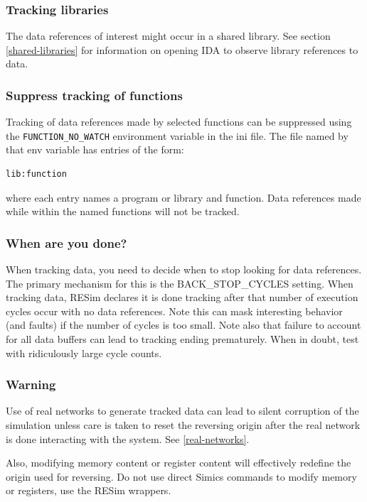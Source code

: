 \documentclass[titlepage]{article}
\begin{document}
\subsubsection{Tracking libraries}
The data references of interest might occur in a shared library.  See section \ref{shared-libraries} for information on opening IDA to 
observe library references to data.

\subsubsection{Suppress tracking of functions}
\label{function_no_watch}
Tracking of data references made by selected functions can be suppressed using the {\tt FUNCTION\_NO\_WATCH} environment variable in the ini file.
The file named by that env variable has entries of the form:
\begin{verbatim}
lib:function
\end{verbatim}
\noindent where each entry names a program or library and function.  Data references made while within the named functions will not be tracked.

\subsubsection{When are you done?}
When tracking data, you need to decide when to stop looking for data references.  The primary mechanism for this is the BACK\_STOP\_CYCLES
setting.  When tracking data, RESim declares it is done tracking after that number of execution cycles occur with no data references.
Note this can mask interesting behavior (and faults) if the number of cycles is too small.  Note also that failure to account for all data
buffers can lead to tracking ending prematurely.  When in doubt, test with ridiculously large cycle counts.

\subsubsection{Warning}
Use of real networks to generate tracked data can lead to silent corruption of the simulation unless care is taken to reset the reversing origin
after the real network is done interacting with the system.  See \ref{real-networks}.

Also, modifying memory content or register content will effectively redefine the origin used for reversing.  Do not use direct Simics commands to modify 
memory or registers, use the RESim wrappers.
\end{document}

